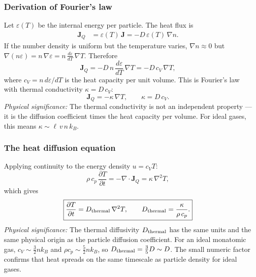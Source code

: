 \subsubsection*{Derivation of Fourier's law}
Let $\varepsilon(T)$ be the internal energy per particle. The heat flux is
\begin{align}
    \mathbf{J}_Q
    &= \varepsilon(T)\,\mathbf{J}
    = -D\,\varepsilon(T)\,\nabla n .
    \label{eq:lec06:Jq-step1}
\end{align}
If the number density is uniform but the temperature varies,
$\nabla n \approx 0$ but $\nabla(n\varepsilon) = n\,\nabla\varepsilon
= n\,\frac{d\varepsilon}{dT}\,\nabla T$. Therefore
\begin{equation}
    \mathbf{J}_Q
    = -D\,n\,\frac{d\varepsilon}{dT}\,\nabla T
    = -D\,c_V\,\nabla T ,
    \label{eq:lec06:Jq-step2}
\end{equation}
where $c_V = n\,d\varepsilon/dT$ is the heat capacity per unit volume. This
is Fourier's law with thermal conductivity $\kappa = D\,c_V$:
\begin{equation}
    \boxed{
    \mathbf{J}_Q = -\kappa\,\nabla T,
    \qquad
    \kappa = D\,c_V .
    }
    \label{eq:lec06:fourier}
\end{equation}
\textit{Physical significance:} The thermal conductivity is not an independent
property — it is the diffusion coefficient times the heat capacity per volume.
For ideal gases, this means $\kappa \sim \ell\,v\,n\,k_B$.

\subsubsection*{The heat diffusion equation}
Applying continuity to the energy density $u = c_V T$:
\begin{equation}
    \rho\,c_p\,\frac{\partial T}{\partial t}
    = -\nabla\cdot\mathbf{J}_Q
    = \kappa\,\nabla^2 T ,
    \label{eq:lec06:heat-eq-derivation}
\end{equation}
which gives
\begin{equation}
    \boxed{
    \frac{\partial T}{\partial t}
    = D_{\rm thermal}\,\nabla^2 T,
    \qquad
    D_{\rm thermal} = \frac{\kappa}{\rho\,c_p} .
    }
    \label{eq:lec06:heat-equation}
\end{equation}
\textit{Physical significance:} The thermal diffusivity $D_{\rm thermal}$ has
the same units and the same physical origin as the particle diffusion
coefficient. For an ideal monatomic gas, $c_V \sim \frac{3}{2}nk_B$ and
$\rho c_p \sim \frac{5}{2}nk_B$, so $D_{\rm thermal} = \frac{3}{5}D
\sim D$. The small numeric factor confirms that heat spreads on the same
timescale as particle density for ideal gases.

